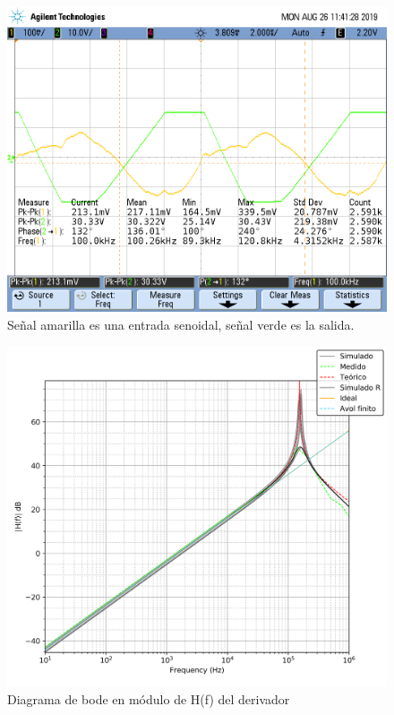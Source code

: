 \begin{figure}[H]
	\centering
	\includegraphics[scale=0.4]{../EJ4/Derivador/Mediciones/Osciloscopio/Justificacion/scope_4.png}
	\caption{Se\~nal amarilla es una entrada senoidal, se\~nal verde es la salida.}
	\label{fig:justificacion_derivador}
\end{figure}

\begin{figure}[H]
	\centering
	\includegraphics[scale=0.6]{../EJ4/Recursos/Derivador/bode_modulo.png}
	\caption{Diagrama de bode en m\'odulo de H(f) del derivador}
	\label{fig:derivador_bode_modulo}
\end{figure}

